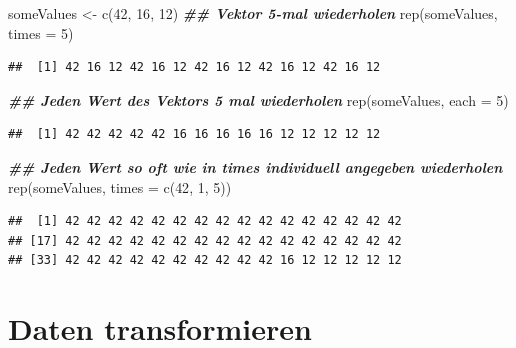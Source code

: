 \documentclass[
]{book}
\newenvironment{Shaded}{\begin{snugshade}}{\end{snugshade}}
\newcommand{\AttributeTok}[1]{\textcolor[rgb]{0.77,0.63,0.00}{#1}}
\newcommand{\DecValTok}[1]{\textcolor[rgb]{0.00,0.00,0.81}{#1}}
\newcommand{\DocumentationTok}[1]{\textcolor[rgb]{0.56,0.35,0.01}{\textbf{\textit{#1}}}}
\newcommand{\FunctionTok}[1]{\textcolor[rgb]{0.00,0.00,0.00}{#1}}
\newcommand{\NormalTok}[1]{#1}
\newcommand{\OtherTok}[1]{\textcolor[rgb]{0.56,0.35,0.01}{#1}}
\begin{document}
\scriptsize

\begin{Shaded}
\begin{Highlighting}[]
\NormalTok{someValues }\OtherTok{\textless{}{-}} \FunctionTok{c}\NormalTok{(}\DecValTok{42}\NormalTok{, }\DecValTok{16}\NormalTok{, }\DecValTok{12}\NormalTok{)}
 \DocumentationTok{\#\# Vektor 5{-}mal wiederholen}
\FunctionTok{rep}\NormalTok{(someValues, }\AttributeTok{times =} \DecValTok{5}\NormalTok{)}
\end{Highlighting}
\end{Shaded}

\begin{verbatim}
##  [1] 42 16 12 42 16 12 42 16 12 42 16 12 42 16 12
\end{verbatim}

\begin{Shaded}
\begin{Highlighting}[]
 \DocumentationTok{\#\# Jeden Wert des Vektors 5 mal wiederholen}
\FunctionTok{rep}\NormalTok{(someValues, }\AttributeTok{each =} \DecValTok{5}\NormalTok{)}
\end{Highlighting}
\end{Shaded}

\begin{verbatim}
##  [1] 42 42 42 42 42 16 16 16 16 16 12 12 12 12 12
\end{verbatim}

\begin{Shaded}
\begin{Highlighting}[]
 \DocumentationTok{\#\# Jeden Wert so oft wie in times individuell angegeben wiederholen}
\FunctionTok{rep}\NormalTok{(someValues, }\AttributeTok{times =} \FunctionTok{c}\NormalTok{(}\DecValTok{42}\NormalTok{, }\DecValTok{1}\NormalTok{, }\DecValTok{5}\NormalTok{))}
\end{Highlighting}
\end{Shaded}

\begin{verbatim}
##  [1] 42 42 42 42 42 42 42 42 42 42 42 42 42 42 42 42
## [17] 42 42 42 42 42 42 42 42 42 42 42 42 42 42 42 42
## [33] 42 42 42 42 42 42 42 42 42 42 16 12 12 12 12 12
\end{verbatim}

\hypertarget{daten-transformieren}{%
\section{Daten transformieren}\label{daten-transformieren}}
\end{document}
